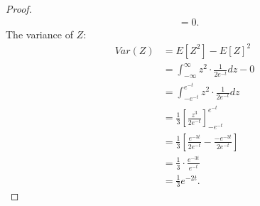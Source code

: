 \documentclass[a4paper]{article}
\begin{document}
\begin{enumerate}
\begin{proof}
\begin{align*}
                &= 0 
      .\end{align*}
      The variance of $Z$:
       \begin{align*}
         Var(Z) &= E[Z^{2}] - E[Z]^{2} \\
                &= \int_{-\infty}^{\infty} z^{2} \cdot \frac{1}{2e^{-t}} dz - 0 \\
                &= \int_{-e^{-t}}^{e^{-t}} z^{2} \cdot \frac{1}{2e^{-t}} dz \\
                &= \frac{1}{3}  [\frac{z^{3}}{2e^{-t}}]_{-e^{-t}}^{e^{-t}} \\
                &= \frac{1}{3} [\frac{e^{-3t}}{2e^{-t}} - \frac{-e^{-3t}}{2e^{-t}}] \\
                &= \frac{1}{3} \cdot \frac{e^{-3t}}{e^{-t}} \\
                &= \frac{1}{3} e^{-2t}
       .\end{align*} 
    \end{proof}
\end{enumerate}
  
\end{document}
